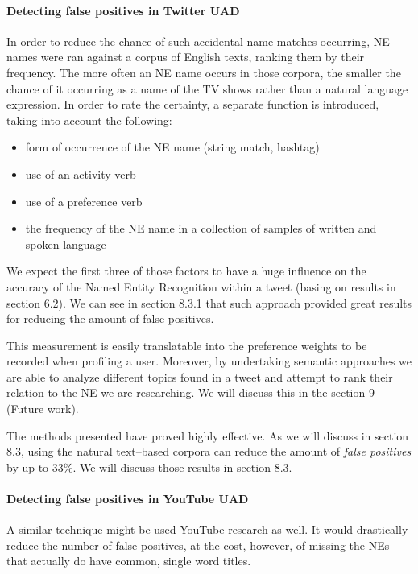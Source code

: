 \paragraph{Detecting false positives in Twitter UAD}

In order to reduce the chance of such accidental name matches occurring, NE names were ran against a corpus
of English texts, ranking them by their frequency. The more often an NE name occurs in those corpora, the smaller the chance of it occurring as a name of the TV shows rather than a natural language expression. In order to rate the certainty, a separate function is introduced, taking into account the following:

\begin{itemize}
  \item form of occurrence of the NE name (string match, hashtag)
  \item use of an activity verb
  \item use of a preference verb
  \item the frequency of the NE name in a collection of samples of written and spoken language
\end{itemize}

We expect the first three of those factors to have a huge influence on the accuracy of the Named Entity Recognition within
a tweet (basing on results in section 6.2). We can see in section 8.3.1 that such approach provided great results for
reducing the amount of false positives.

This measurement is easily translatable into the preference weights to be recorded when profiling a user.
Moreover, by undertaking semantic approaches we are able to analyze different topics found in a tweet and
attempt to rank their relation to the NE we are researching. We will discuss this in the section 9 (Future work).

The methods presented have proved highly effective. As we will discuss in section 8.3, using the natural
text--based corpora can reduce the amount of \textit{false positives} by up to 33\%. We will discuss those
results in section 8.3.

\paragraph{Detecting false positives in YouTube UAD}

A similar technique might be used YouTube research as well. It would drastically
reduce the number of false positives, at the cost, however, of missing the NEs
that actually do have common, single word titles.

